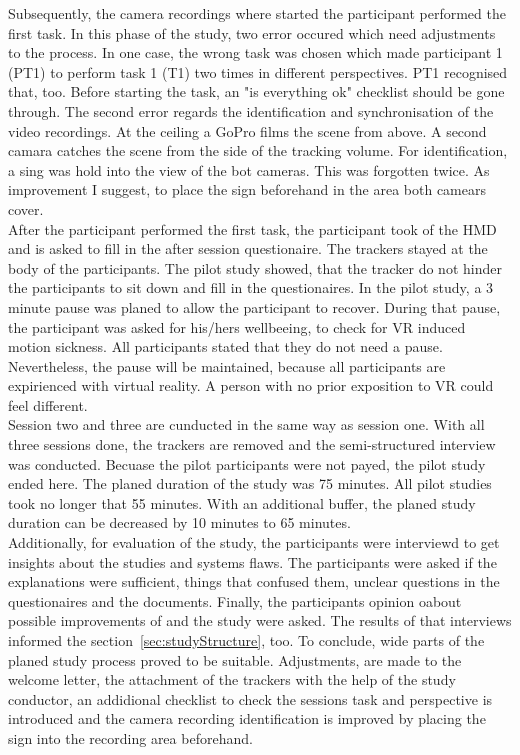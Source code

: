 Subsequently, the camera recordings where started the participant performed the first task. In this phase of the study, two error occured which need adjustments to the process. In one case, the wrong task was chosen which made participant 1 (PT1) to perform task 1 (T1) two times in different perspectives. PT1 recognised that, too. Before starting the task, an "is everything ok" checklist should be gone through. The second error regards the identification and synchronisation of the video recordings. At the ceiling a GoPro films the scene from above. A second camara catches the scene from the side of the tracking volume. For identification, a sing was hold into the view of the bot cameras. This was forgotten twice. As improvement I suggest, to place the sign beforehand in the area both camears cover.\\
After the participant performed the first task, the participant took of the HMD and is asked to fill in the after session questionaire. The trackers stayed at the body of the participants. The pilot study showed, that the tracker do not hinder the participants to sit down and fill in the questionaires. In the pilot study, a 3 minute pause was planed to allow the participant to recover. During that pause, the participant was asked for his/hers wellbeeing, to check for VR induced motion sickness. All participants stated that they do not need a pause. Nevertheless, the pause will be maintained, because all participants are expirienced with virtual reality. A person with no prior exposition to VR could feel different.\\
Session two and three are cunducted in the same way as session one. With all three sessions done, the trackers are removed and the semi-structured interview was conducted. Becuase the pilot participants were not payed, the pilot study ended here. The planed duration of the study was 75 minutes. All pilot studies took no longer that 55 minutes.  With an additional buffer, the planed study duration can be decreased by 10 minutes to 65 minutes.\\
Additionally, for evaluation of the study, the participants were interviewd to get insights about the studies and systems flaws. The participants were asked if the explanations were sufficient, things that confused them, unclear questions in the questionaires and the documents. Finally, the participants opinion oabout possible improvements of \exgo and the study were asked. The results of that interviews informed the section~\ref{sec:studyStructure}, too.
To conclude, wide parts of the planed study process proved to be suitable. Adjustments, are made to the welcome letter, the attachment of the trackers with the help of the study conductor, an addidional checklist to check the sessions task and perspective is introduced and the camera recording identification is improved by placing the sign into the recording area beforehand.

